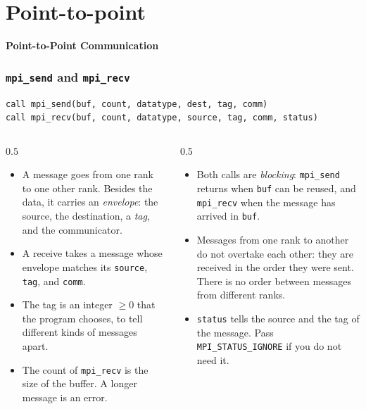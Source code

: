 \section{Point-to-point}

\begin{frame}
  \centering
  \Huge \textbf{Point-to-Point Communication}
\end{frame}


\begin{frame}[fragile]
  \frametitle{\texttt{mpi\_send} and \texttt{mpi\_recv}}
\begin{lstlisting}
call mpi_send(buf, count, datatype, dest, tag, comm)
call mpi_recv(buf, count, datatype, source, tag, comm, status)
\end{lstlisting}
  \begin{columns}[T]
    \begin{column}{0.5\textwidth}
      \begin{itemize}
        \item A message goes from one rank to one other rank. Besides the data, it carries an \emph{envelope}: the source, the destination, a \emph{tag}, and the communicator.
        \item A receive takes a message whose envelope matches its \texttt{source}, \texttt{tag}, and \texttt{comm}.
        \item The tag is an integer $\geq 0$ that the program chooses, to tell different kinds of messages apart.
        \item The count of \texttt{mpi\_recv} is the size of the buffer. A longer message is an error.
      \end{itemize}
    \end{column}

    \begin{column}{0.5\textwidth}
      \begin{itemize}
        \item Both calls are \emph{blocking}: \texttt{mpi\_send} returns when \texttt{buf} can be reused, and \texttt{mpi\_recv} when the message has arrived in \texttt{buf}.
        \item Messages from one rank to another do not overtake each other: they are received in the order they were sent. There is no order between messages from different ranks.
        \item \texttt{status} tells the source and the tag of the message. Pass \texttt{MPI\_STATUS\_IGNORE} if you do not need it.
      \end{itemize}
    \end{column}
  \end{columns}
\end{frame}


